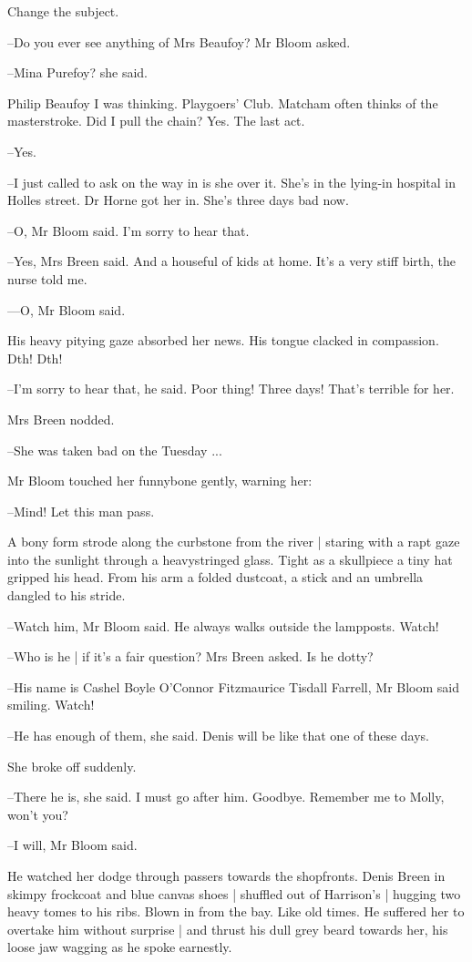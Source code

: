 Change the subject.

--Do you ever see anything of Mrs Beaufoy?
Mr Bloom asked.

--Mina Purefoy?
she said.

Philip Beaufoy I was thinking.
Playgoers' Club.
Matcham often thinks of the masterstroke.
Did I pull the chain?
Yes.
The last act.

--Yes.

--I just called to ask on the way in is she over it.
She's in the lying-in hospital in Holles street.
Dr Horne got her in.
She's three days bad now.

--O,
Mr Bloom said.
I'm sorry to hear that.

--Yes,
Mrs Breen said.
And a houseful of kids at home.
It's a very stiff birth,
the nurse told me.

---O,
Mr Bloom said.

His heavy pitying gaze absorbed her news.
His tongue clacked in compassion.
Dth!
Dth!

--I'm sorry to hear that,
he said.
Poor thing!
Three days!
That's terrible for her.

Mrs Breen nodded.

--She was taken bad on the Tuesday ...

Mr Bloom touched her funnybone gently,
warning her:

--Mind!
Let this man pass.

A bony form strode along the curbstone from the river |
staring with a rapt gaze into the sunlight through a heavystringed glass.
Tight as a skullpiece a tiny hat gripped his head.
From his arm a folded dustcoat,
a stick and an umbrella dangled to his stride.

--Watch him,
Mr Bloom said.
He always walks outside the lampposts.
Watch!

--Who is he |
if it's a fair question?
Mrs Breen asked.
Is he dotty?

--His name is Cashel Boyle O'Connor Fitzmaurice Tisdall Farrell,
Mr Bloom said smiling.
Watch!

--He has enough of them,
she said.
Denis will be like that one of these days.

She broke off suddenly.

--There he is,
she said.
I must go after him.
Goodbye.
Remember me to Molly,
won't you?

--I will,
Mr Bloom said.

He watched her dodge through passers towards the shopfronts.
Denis Breen in skimpy frockcoat and blue canvas shoes |
shuffled out of Harrison's |
hugging two heavy tomes to his ribs.
Blown in from the bay.
Like old times.
He suffered her to overtake him without surprise |
and thrust his dull grey beard towards her,
his loose jaw wagging as he spoke earnestly.

